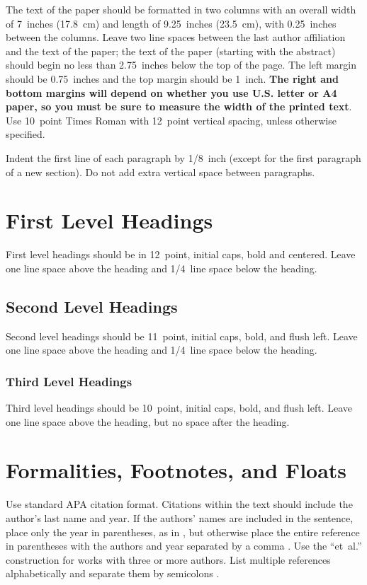 \documentclass[10pt,letterpaper]{article}
\begin{document}
The text of the paper should be formatted in two columns with an overall width of 7~inches
(17.8~cm) and length of 9.25~inches (23.5~cm), with 0.25~inches between the columns. Leave two line
spaces between the last author affiliation and the text of the paper; the text of the paper
(starting with the abstract) should begin no less than 2.75~inches below the top of the page. The
left margin should be 0.75~inches and the top margin should be 1~inch. \textbf{The right and bottom
  margins will depend on whether you use U.S. letter or A4 paper, so you must be sure to measure the
  width of the printed text}. Use 10~point Times Roman with 12~point vertical spacing, unless
otherwise specified.

Indent the first line of each paragraph by 1/8~inch (except for the first paragraph of a new
section). Do not add extra vertical space between paragraphs.

\section{First Level Headings}

First level headings should be in 12~point, initial caps, bold and centered. Leave one line space
above the heading and 1/4~line space below the heading.

\subsection{Second Level Headings}

Second level headings should be 11~point, initial caps, bold, and flush left. Leave one line space
above the heading and 1/4~line space below the heading.

\subsubsection{Third Level Headings}

Third level headings should be 10~point, initial caps, bold, and flush left. Leave one line space
above the heading, but no space after the heading.

\section{Formalities, Footnotes, and Floats}

Use standard APA citation format. Citations within the text should include the author's last name
and year. If the authors' names are included in the sentence, place only the year in parentheses,
as in \citet{DaphneEcho2022}, but otherwise place the entire reference in parentheses with the
authors and year separated by a comma \citep{DaphneEcho2022}. Use the ``et~al.'' construction for
works with three or more authors. List multiple references alphabetically and separate them by
semicolons \citep{August2007, DaphneEcho2022}.
\end{document}
